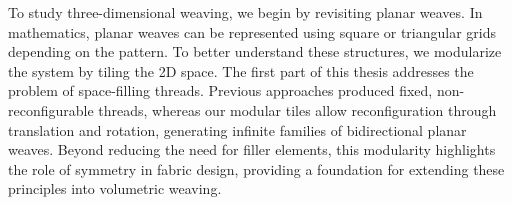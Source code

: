


To study three-dimensional weaving, we begin by revisiting planar weaves. In mathematics, planar weaves can be represented using square or triangular grids depending on the pattern. To better understand these structures, we modularize the system by tiling the 2D space. The first part of this thesis addresses the problem of space-filling threads. Previous approaches produced fixed, non-reconfigurable threads, whereas our modular tiles allow reconfiguration through translation and rotation, generating infinite families of bidirectional planar weaves. Beyond reducing the need for filler elements, this modularity highlights the role of symmetry in fabric design, providing a foundation for extending these principles into volumetric weaving.

